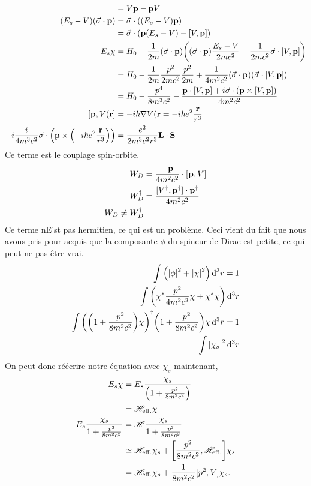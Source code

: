 \begin{align}
    [V(\vb{r}),\vb{p}]&=V\vb{p}-\vb{p}V\\
    (E_s-V)(\va{\sigma}\cdot\vb{p})
                      &=\va{\sigma}\cdot\qty((E_s-V)\vb{p})\\
                      &=\va{\sigma}\cdot\qty(\vb{p}(E_s-V)-[V,\vb{p}])\\
    E_s\chi&=H_0-\frac1{2m}(\va{\sigma}\cdot\vb{p})\qty((\va{\sigma}\cdot\vb{p})
    \frac{E_s-V}{2mc^2}-\frac1{2mc^2}\va{\sigma}\cdot[V,\vb{p}]
    )\\
           &=H_0-\frac1{2m}\frac{p^2}{2mc^2}\frac{p^2}{2m}
           +\frac1{4m^2c^2}(\va{\sigma}\cdot\vb{p})\qty(\va{\sigma}\cdot[V,\vb{p}]) \\
           &=H_0-\frac{p^4}{8m^3c^2}
           -\frac{\vb{p}\cdot[V,\vb{p}]+i\va{\sigma}\cdot(\vb{p}\times[V,\vb{p}])}
           {4m^2c^2}\\
    [\vb{p},V(\vb{r}]&=-i\hbar\nabla V(\vb{r}=-i\hbar e^2\frac{\vb{r}}{r^3}\\
    -i\frac{i}{4m^3c^2}\va{\sigma}\cdot\qty(\vb{p}\times\qty(-i\hbar e^2
    \frac{\vb{r}}{r^3}))
           &=\frac{e^2}{2m^3c^2r^3}\vb{L}\cdot\vb{S}
\end{align}
Ce terme est le couplage spin-orbite.
\begin{align}
    W_D&=\frac{-\vb{p}}{4m^2c^2}\cdot[\vb{p},V]\\
    W_D^\dagger&=\frac{[V^\dagger,\vb{p}^\dagger]\cdot\vb{p}^\dagger}{4m^2c^2}\\
    W_D\neq W_D^\dagger
\end{align}
Ce terme nE'st pas hermitien, ce qui est un problème. Ceci vient du fait que
nous avons pris pour acquis que la composante $\phi$ du spineur de Dirac est
petite, ce qui peut ne pas être vrai.
\begin{align}
    \int\qty(\abs{\phi}^2+\abs{\chi}^2)\dd[3]{r}=1\\
    \int\qty(\chi^*\frac{p^2}{4m^2c^2}\chi+\chi^*\chi)\dd[3]{r}\\
    \int\qty(\qty(1+\frac{p^2}{8m^2c^2})\chi)^\dagger
    \qty(1+\frac{p^2}{8m^2c^2})\chi\dd[3]{r}=1\\
    \int\abs{\chi_s}^2\dd[3]{r}
\end{align}
On peut donc réécrire notre équation avec $\chi_s$ maintenant,
\begin{align}
    E_s\chi&=E_s\frac{\chi_s}{\qty(1+\frac{p^2}{8m^2c^2})}\\
           &=\mathscr{H}_{\rm eff.}\chi\\
           E_s\frac{\chi_s}{1+\frac{p^2}{8m^2c^2}}
           &=\mathscr{H}\frac{\chi_s}{1+\frac{p^2}{8m^2c^2}}\\
           &\simeq\mathscr{H}_{\rm eff.}\chi_s+
           \qty[\frac{p^2}{8m^2c^2},\mathscr{H}_{\rm eff.}]\chi_s\\
           &=\mathscr{H}_{\rm eff.}\chi_s
           +\frac1{8m^2c^2}[p^2,V]\chi_s.
\end{align}
